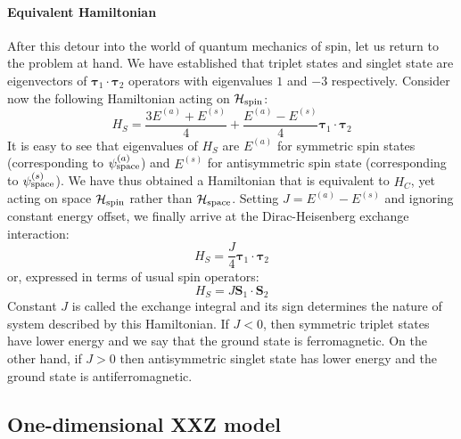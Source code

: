 \paragraph{Equivalent Hamiltonian}After this detour into the world of quantum mechanics of spin, let us return to the problem
at hand. We have established that triplet states and singlet state are eigenvectors of 
\(\bm{\tau}_1 \cdot \bm{\tau}_2\) operators with eigenvalues \(1\) and \(-3\) respectively.
Consider now the following Hamiltonian acting on \(\mathcal{H}_{\textrm{spin}}\):
\begin{equation}
    H_S = \frac{3 E^{(a)} + E^{(s)}}{4} + \frac{E^{(a)} - E^{(s)}}{4} \bm{\tau}_1 \cdot \bm{\tau}_2
    \label{eq:Coulomb recasted}
\end{equation}
It is easy to see that eigenvalues of \(H_S\) are \(E^{(a)}\) for symmetric spin states
(corresponding to \(\psi_{\textrm{space}}^{(a)}\)) and \(E^{(s)}\) for antisymmetric spin state (corresponding to \(\psi_{\textrm{space}}^{(s)}\)).
We have thus obtained a Hamiltonian that is equivalent to \(H_C\), yet acting on space 
\(\mathcal{H}_{\textrm{spin}}\) rather than \(\mathcal{H}_{\textrm{space}}\). Setting \(J = E^{(a)} - E^{(s)}\) and ignoring
constant energy offset, we finally arrive at the Dirac-Heisenberg exchange interaction:
\begin{equation}
    H_S = \frac{J}{4} \bm{\tau}_1 \cdot \bm{\tau}_2
\end{equation}
or, expressed in terms of usual spin operators:
\begin{equation}
    H_S = J \bm{S}_1 \cdot \bm{S}_2
    \label{eq:heisenberg dirac}
\end{equation}
Constant \(J\) is called the exchange integral and its sign determines the nature of system described
by this Hamiltonian. If \(J<0\), then symmetric triplet states have lower energy and we say that
the ground state is ferromagnetic. On the other hand, if \(J>0\) then antisymmetric singlet
state has lower energy and the ground state is antiferromagnetic.  

\subsection{One-dimensional XXZ model}
